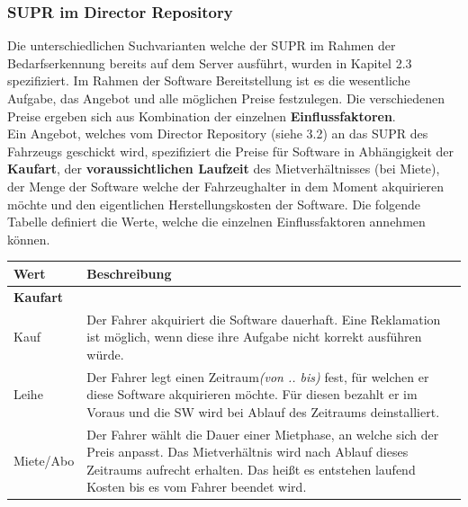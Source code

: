\subsubsection{SUPR im Director Repository}
Die unterschiedlichen Suchvarianten welche der SUPR im Rahmen der Bedarfserkennung bereits auf dem Server ausführt, wurden in Kapitel 2.3 spezifiziert. Im Rahmen der Software Bereitstellung ist es die wesentliche Aufgabe, das Angebot und alle möglichen Preise festzulegen. Die verschiedenen Preise ergeben sich aus Kombination der einzelnen \textbf{Einflussfaktoren}.\\
Ein Angebot, welches vom Director Repository (siehe 3.2) an das SUPR des Fahrzeugs geschickt wird, spezifiziert die Preise für Software in Abhängigkeit der \textbf{Kaufart}, der \textbf{voraussichtlichen Laufzeit} des Mietverhältnisses (bei Miete), der Menge der Software welche der Fahrzeughalter in dem Moment akquirieren möchte und den eigentlichen Herstellungskosten der Software. Die folgende Tabelle definiert die Werte, welche die einzelnen Einflussfaktoren annehmen können.\\
\begin{center}
	\begin{tabularx}{\linewidth}{|p{2.8cm}|X|}
		\hline
		\textbf{Wert} & \textbf{Beschreibung}\\ [0.5ex] 
		\hline\hline
		\multicolumn{2}{|l|}{\textbf{Kaufart}}\\
		\hline
		Kauf & Der Fahrer akquiriert die Software dauerhaft. Eine Reklamation ist möglich, wenn diese ihre Aufgabe nicht korrekt ausführen würde.\\
		\hline
		Leihe & Der Fahrer legt einen Zeitraum\textit{(von .. bis)} fest, für welchen er diese Software akquirieren möchte. Für diesen bezahlt er im Voraus und die SW wird bei Ablauf des Zeitraums deinstalliert.\\
		\hline
		Miete/Abo & Der Fahrer wählt die Dauer einer Mietphase, an welche sich der Preis anpasst. Das Mietverhältnis wird nach Ablauf dieses Zeitraums aufrecht erhalten. Das heißt es entstehen laufend Kosten bis es vom Fahrer beendet wird.\\
		\hline
	\end{tabularx}
\end{center}
